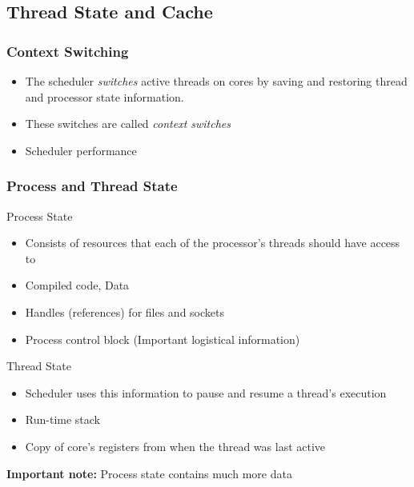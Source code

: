 \documentclass{beamer}
\begin{document}
\subsection[Cache]{Thread State and Cache}

\begin{frame}
\frametitle{Context Switching}
\begin{itemize}
\item The scheduler \emph{switches} active threads on cores by saving and restoring thread and processor state information.
\item These switches are called \emph{context switches}
\item Scheduler performance 
\end{itemize}
\end{frame}

\begin{frame}
\frametitle{Process and Thread State}

Process State

\begin{itemize}
	\item[] Consists of resources that each of the processor's threads should have access to
	\item Compiled code, Data
	\item Handles (references) for files and sockets
	\item Process control block (Important logistical information)
\end{itemize}

Thread State

\begin{itemize}
	\item[] Scheduler uses this information to pause and resume a thread's execution
	\item Run-time stack
	\item Copy of core's registers from when the thread was last active
\end{itemize}

\textbf{Important note:} Process state contains much more data

\end{frame}
\end{document}
